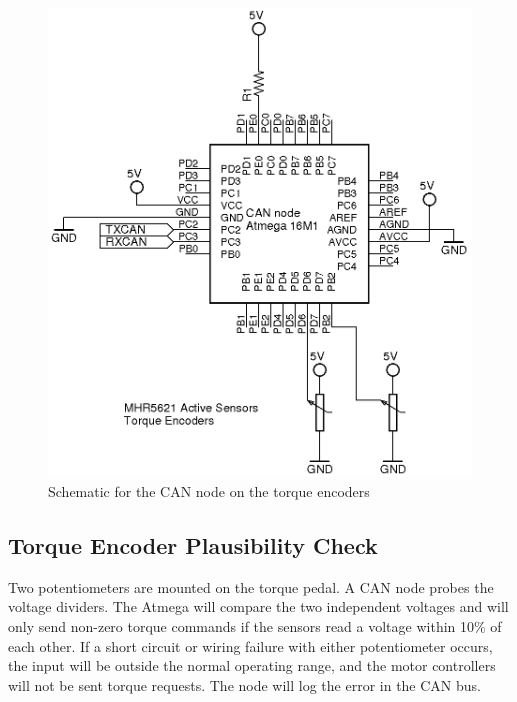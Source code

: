 \documentclass{article}
\begin{document}
        \begin{figure}[H]
            \centering
            \includegraphics{CANtorque}
            \caption{Schematic for the CAN node on the torque encoders}
            \label{torqueencoders}
        \end{figure}

    \subsection{Torque Encoder Plausibility Check}

        
        Two potentiometers are mounted on the torque pedal. A CAN node probes the voltage dividers. The Atmega will compare the two independent voltages and will only send non-zero torque commands if the sensors read a voltage within 10\% of each other. If a short circuit or wiring failure with either potentiometer occurs, the input will be outside the normal operating range, and the motor controllers will not be sent torque requests. The node will log the error in the CAN bus.\\
        
\end{document}
